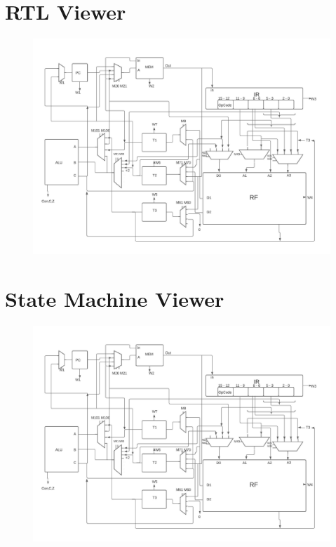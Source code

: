 \documentclass[11pt, fleqn]{article}
\begin{document}
\newpage
\section*{RTL Viewer}
\begin{figure}[H]
    \centering
    \includegraphics[scale=0.65]{crd.jpeg}
\end{figure}

\newpage
\section*{State Machine Viewer}
\begin{figure}[H]
    \centering
    \includegraphics[scale=0.65]{crd.jpeg}
\end{figure}
\end{document}
